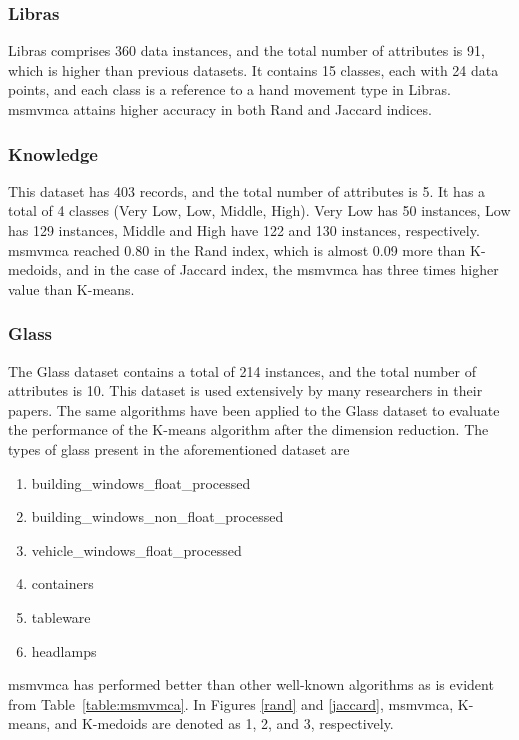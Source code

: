 \documentclass[fleqn,usenatbib]{mnras}
\begin{document}
\subsubsection{Libras}

Libras comprises 360 data instances, and the total number of attributes is 91, which is higher than previous datasets. It contains 15 classes, each with 24 data points, and each class is a reference to a hand movement type in Libras. \acrshort{msmvmca} attains higher accuracy in both Rand and Jaccard indices.

\subsubsection{Knowledge}

This dataset has 403 records, and the total number of attributes is 5. It has a total of 4 classes (Very Low, Low, Middle, High). Very Low has 50 instances, Low has 129 instances, Middle and High have 122 and 130 instances, respectively. 
\acrshort{msmvmca} reached 0.80 in the Rand index, which is almost 0.09 more than K-medoids, and in the case of Jaccard index, the \acrshort{msmvmca} has three times higher value than K-means.

\subsubsection{Glass}

The Glass dataset contains a total of 214 instances, and the total number of attributes is 10. This dataset is used extensively by many researchers in their papers. The same algorithms have been applied to the Glass dataset to evaluate the performance of the K-means algorithm after the dimension reduction.
The types of glass present in the aforementioned dataset are
\begin{enumerate}
\item  building\_windows\_float\_processed 
\item building\_windows\_non\_float\_processed  
\item vehicle\_windows\_float\_processed 
\item containers  
\item tableware 
\item headlamps
\end{enumerate}
\acrshort{msmvmca} has performed better than other well-known algorithms as is evident from Table~\ref{table:msmvmca}.
In Figures %
\ref{rand} and \ref{jaccard},
\acrshort{msmvmca}, K-means, and K-medoids are denoted as 1, 2, and 3, respectively.
\end{document}
